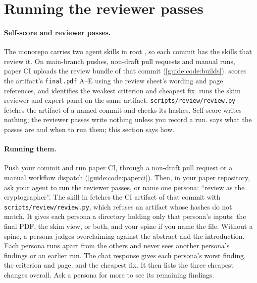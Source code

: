 \section{Running the reviewer passes}\label{guide:code:reviewers}
\paragraph{Self-score and reviewer passes.} The monorepo carries two agent skills in root , so each commit has the skills that review it. On main-branch pushes, non-draft pull requests and manual runs, paper CI uploads the review bundle of that commit (\cref{guide:code:builds}).  scores the artifact's \texttt{final.pdf} A--E using the review sheet's wording and page references, and identifies the weakest criterion and cheapest fix.  runs the skim reviewer and expert panel on the same artifact. \texttt{scripts/review/review.py} fetches the artifact of a named commit and checks its hashes. Self-score writes nothing; the reviewer passes write nothing unless you record a run.  says what the passes are and when to run them; this section says how.

\paragraph{Running them.} Push your commit and run paper CI, through a non-draft pull request or a manual workflow dispatch (\cref{guide:code:paperci}). Then, in your paper repository, ask your agent to run the reviewer passes, or name one persona: \enquote{review as the cryptographer}. The skill in  fetches the CI artifact of that commit with \texttt{scripts/review/review.py}, which refuses an artifact whose hashes do not match. It gives each persona a directory holding only that persona's inputs: the final PDF, the skim view, or both, and your spine if you name the file. Without a spine, a persona judges overclaiming against the abstract and the introduction. Each persona runs apart from the others and never sees another persona's findings or an earlier run. The chat response gives each persona's worst finding, the criterion and page, and the cheapest fix. It then lists the three cheapest changes overall. Ask a persona for more to see its remaining findings.

